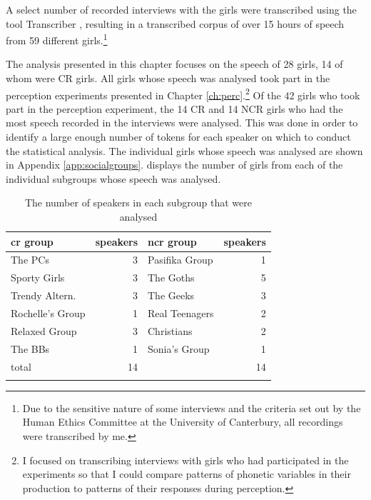 A select number of recorded interviews with the girls were transcribed using the tool Transcriber \citep{Transcriber-SpeechComm2000}, resulting in a transcribed corpus of over 15 hours of speech from 59 different girls.\footnote{Due to the sensitive nature of some interviews and the criteria set out by the Human Ethics Committee at the University of Canterbury, all recordings were transcribed by me.} 
\nocite{Transcriber-SpeechComm2000}

The analysis presented in this chapter focuses on the speech of 28 girls, 14 of whom were CR girls. All girls whose speech was analysed took part in the perception experiments presented in Chapter \ref{ch:perc}.\footnote{I focused on transcribing interviews with girls who had participated in the experiments so that I could compare patterns of phonetic variables in their production to patterns of their responses during perception.} Of the 42 girls who took part in the perception experiment, the 14 CR and 14 NCR girls who had the most speech recorded in the interviews were analysed. This was done in order to identify a large enough number of tokens for each speaker on which to conduct the statistical analysis.  The individual girls whose speech was analysed are shown in Appendix \ref{app:socialgroups}.   displays the number of girls from each of the individual subgroups whose speech was analysed.

\begin{table}[htbp]
\caption{The number of speakers in each subgroup that were analysed}	
	\label{tab:groupsprod}
	 \begin{center}
		\begin{tabular}{lrlr}
		\lsptoprule
		\sc cr group & \sc speakers & \sc ncr group & \sc speakers \\
 \midrule
The PCs & 3       &Pasifika Group & 1  \\
Sporty Girls & 3  &The Goths & 5 \\
Trendy Altern. & 3  &The Geeks & 3  \\
Rochelle's Group & 1   &Real Teenagers & 2 \\
Relaxed Group & 3      &Christians & 2 \\
The BBs & 1        &Sonia's Group & 1  \\\midrule
\sc total & 14  & & 14  \\

\lspbottomrule
		\end{tabular}
	
	\end{center}
\end{table} 


